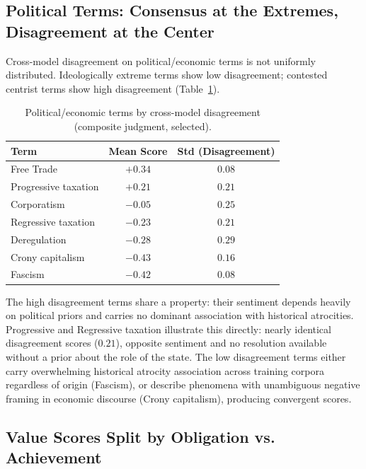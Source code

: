 \documentclass[11pt, letterpaper]{article}
\begin{document}
\pagebreak

\subsection{Political Terms: Consensus at the Extremes, Disagreement at the Center}

Cross-model disagreement on political/economic terms is not uniformly distributed. Ideologically extreme terms show low disagreement; contested centrist terms show high disagreement (Table~\ref{tab:political_terms}).

\begin{table}[H]
  \centering
  \begin{tabular}{lcc}
    \toprule
    \textbf{Term} & \textbf{Mean Score} & \textbf{Std (Disagreement)} \\
    \midrule
    Free Trade           & $+0.34$ & $0.08$ \\
    Progressive taxation & $+0.21$ & $0.21$ \\
    Corporatism          & $-0.05$ & $0.25$ \\
    Regressive taxation  & $-0.23$ & $0.21$ \\
    Deregulation         & $-0.28$ & $0.29$ \\
    Crony capitalism     & $-0.43$ & $0.16$ \\
    Fascism              & $-0.42$ & $0.08$ \\
    \bottomrule
  \end{tabular}
  \caption{Political/economic terms by cross-model disagreement (composite
  judgment, selected).}
  \label{tab:political_terms}
\end{table}

The high disagreement terms share a property: their sentiment depends heavily on political priors and carries no dominant association with historical atrocities. Progressive and Regressive taxation illustrate this directly: nearly identical disagreement scores ($0.21$), opposite sentiment and no resolution available without a prior about the role of the state. The low disagreement terms either carry overwhelming historical atrocity association across training corpora regardless of origin (Fascism), or describe phenomena with unambiguous negative framing in economic discourse (Crony capitalism), producing convergent scores.

\pagebreak

\subsection{Value Scores Split by Obligation vs. Achievement}
\end{document}
